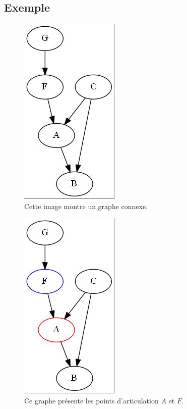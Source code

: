 \documentclass[12pt, oneside]{article}
\begin{document}
\subsection{Exemple}

\begin{figure}[!h]
    \centering
    \includegraphics[scale=0.7,trim=3 3 3 3,clip]{2_3_0}
    \caption{Cette image montre un graphe connexe.}
\end{figure}

\begin{figure}[!h]
    \centering
    \includegraphics[scale=0.7,trim=3 3 3 3,clip]{2_3_1}
    \caption{Ce graphe présente les points d'articulation $A$ et $F$.}
\end{figure}
\end{document}

